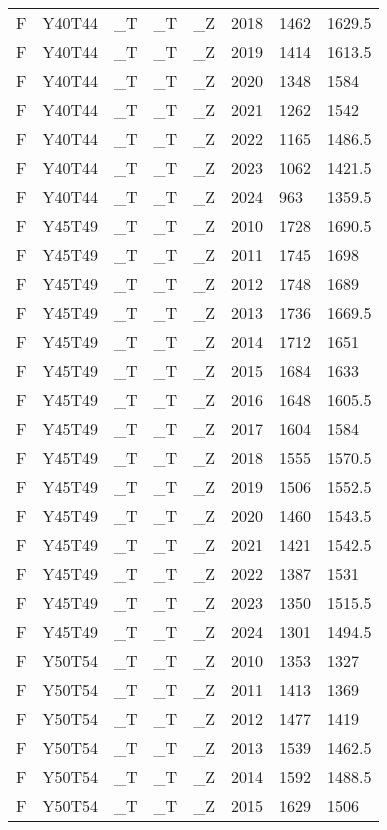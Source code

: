 \begin{longtable}[t]{llllllll}
F & Y40T44 & \_T & \_T & \_Z & 2018 & 1462 & 1629.5\\
F & Y40T44 & \_T & \_T & \_Z & 2019 & 1414 & 1613.5\\
\addlinespace
F & Y40T44 & \_T & \_T & \_Z & 2020 & 1348 & 1584\\
F & Y40T44 & \_T & \_T & \_Z & 2021 & 1262 & 1542\\
F & Y40T44 & \_T & \_T & \_Z & 2022 & 1165 & 1486.5\\
F & Y40T44 & \_T & \_T & \_Z & 2023 & 1062 & 1421.5\\
F & Y40T44 & \_T & \_T & \_Z & 2024 & 963 & 1359.5\\
\addlinespace
F & Y45T49 & \_T & \_T & \_Z & 2010 & 1728 & 1690.5\\
F & Y45T49 & \_T & \_T & \_Z & 2011 & 1745 & 1698\\
F & Y45T49 & \_T & \_T & \_Z & 2012 & 1748 & 1689\\
F & Y45T49 & \_T & \_T & \_Z & 2013 & 1736 & 1669.5\\
F & Y45T49 & \_T & \_T & \_Z & 2014 & 1712 & 1651\\
\addlinespace
F & Y45T49 & \_T & \_T & \_Z & 2015 & 1684 & 1633\\
F & Y45T49 & \_T & \_T & \_Z & 2016 & 1648 & 1605.5\\
F & Y45T49 & \_T & \_T & \_Z & 2017 & 1604 & 1584\\
F & Y45T49 & \_T & \_T & \_Z & 2018 & 1555 & 1570.5\\
F & Y45T49 & \_T & \_T & \_Z & 2019 & 1506 & 1552.5\\
\addlinespace
F & Y45T49 & \_T & \_T & \_Z & 2020 & 1460 & 1543.5\\
F & Y45T49 & \_T & \_T & \_Z & 2021 & 1421 & 1542.5\\
F & Y45T49 & \_T & \_T & \_Z & 2022 & 1387 & 1531\\
F & Y45T49 & \_T & \_T & \_Z & 2023 & 1350 & 1515.5\\
F & Y45T49 & \_T & \_T & \_Z & 2024 & 1301 & 1494.5\\
\addlinespace
F & Y50T54 & \_T & \_T & \_Z & 2010 & 1353 & 1327\\
F & Y50T54 & \_T & \_T & \_Z & 2011 & 1413 & 1369\\
F & Y50T54 & \_T & \_T & \_Z & 2012 & 1477 & 1419\\
F & Y50T54 & \_T & \_T & \_Z & 2013 & 1539 & 1462.5\\
F & Y50T54 & \_T & \_T & \_Z & 2014 & 1592 & 1488.5\\
\addlinespace
F & Y50T54 & \_T & \_T & \_Z & 2015 & 1629 & 1506\\

\end{longtable}
